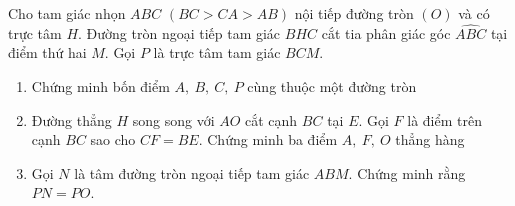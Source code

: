 \begin{ex}%
     Cho tam giác nhọn $ABC$ $(BC>CA>AB)$ nội tiếp đường tròn $(O)$ và có trực tâm $H$. Đường tròn ngoại tiếp tam giác $BHC$ cắt tia phân giác góc $\widehat{ABC}$ tại điểm thứ hai $M$. Gọi $P$ là trực tâm tam giác $BCM.$
     \begin{enumerate}
     \item Chứng minh bốn điểm $A,\ B,\ C,\ P$ cùng thuộc một đường tròn
\item Đường thẳng $H$ song song với $AO$ cắt cạnh $BC$ tại $E$. Gọi $F$ là điểm trên cạnh $BC$ sao cho $CF=BE$. Chứng minh ba điểm $A,\ F,\ O$ thẳng hàng
\item Gọi $N$ là tâm đường tròn ngoại tiếp tam giác $ABM$. Chứng minh rằng $PN=PO$.
         \end{enumerate}
\end{ex}
